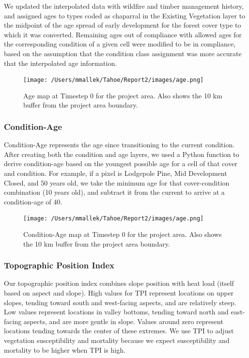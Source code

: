 We updated the interpolated data with wildfire and timber management history, and assigned ages to types coded as chaparral in the Existing Vegetation layer to the midpoint of the age spread of early development for the forest cover type to which it was converted. Remaining ages out of compliance with allowed ages for the corresponding condition of a given cell were modified to be in compliance, based on the assumption that the condition class assignment was more accurate that the interpolated age information.

\begin{figure}[htbp]
\centering
\texttt{[image: /Users/mmallek/Tahoe/Report2/images/age.png]}
\caption{Age map at Timestep 0 for the project area. Also shows the 10 km buffer from the project area boundary.} 
\label{agemap}
\end{figure}

\subsubsection{Condition-Age}
Condition-Age represents the age since transitioning to the current condition. After creating both the condition and age layers, we used a Python function to derive condition-age based on the youngest possible age for a cell of that cover and condition. For example, if a pixel is Lodgepole Pine, Mid Development Closed, and 50 years old, we take the minimum age for that cover-condition combination (10 years old), and subtract it from the current to arrive at a condition-age of 40. 

\begin{figure}[htbp]
\centering
\texttt{[image: /Users/mmallek/Tahoe/Report2/images/age.png]}
\caption{Condition-Age map at Timestep 0 for the project area. Also shows the 10 km buffer from the project area boundary.} 
\label{condagemap}
\end{figure}

\subsubsection{Topographic Position Index}
Our topographic position index combines slope position with heat load (itself based on aspect and slope). High values for TPI represent locations on upper slopes, tending toward south and west-facing aspects, and are relatively steep. Low values represent locations in valley bottoms, tending toward north and east-facing aspects, and are more gentle in slope. Values around zero represent locations tending towards the center of these extremes. We use TPI to adjust vegetation susceptibility and mortality because we expect susceptibility and mortality to be higher when TPI is high.

